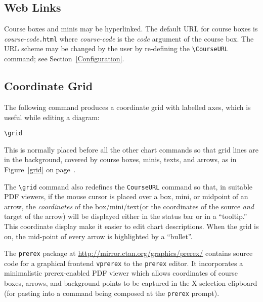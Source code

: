 \documentclass[11pt]{article}
\begin{document}
\subsection{Web Links}
\label{WebLinks}
Course boxes and minis may be hyperlinked.
The default URL for course boxes is 
\emph{course-code}\verb|.html|
where
\emph{course-code}
is
the 
\emph{code}
argument
of the course box. The URL scheme may be changed by the user 
by re-defining the 
\verb|\CourseURL|
command; see Section~\ref{Configuration}.
\subsection{Coordinate Grid}
The following command produces a coordinate grid with labelled axes, which is
useful while editing a diagram: 
\begin{list}{}{}
\item \verb|\grid|
\end{list}
This is normally placed before all the other chart commands so that
grid lines are in the background, covered by course boxes, minis, texts, and arrows,
as in Figure~\ref{grid} on page~\pageref{grid}. 

The \verb|\grid| command
also redefines the \verb|CourseURL| command 
so that, in suitable PDF viewers, 
if the mouse cursor is placed over a box, mini, or midpoint of an arrow,
the \emph{coordinates} of the box/mini/text(or the coordinates of the source \emph{and} target
of the arrow) will be displayed 
either in the 
status bar
or in a
``tooltip.'' 
This coordinate display make it easier to edit chart descriptions.
When the grid is on, the mid-point of every arrow is highlighted by 
a ``bullet''.

The 
\texttt{prerex}
package at 
\url{http://mirror.ctan.org/graphics/prerex/}
contains source code for a graphical frontend 
\texttt{vprerex} to the \texttt{prerex} 
editor. It incorporates a minimalistic prerex-enabled PDF viewer
which allows coordinates of course boxes,
arrows, and
background points to be captured in the X selection clipboard (for pasting into a 
command being composed at the 
\texttt{prerex} 
prompt).
\end{document}
